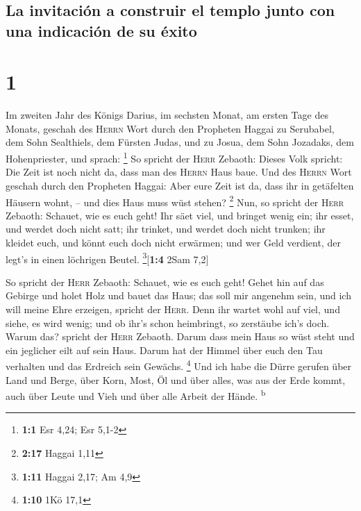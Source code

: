 \hypertarget{la-invitaciuxf3n-a-construir-el-templo-junto-con-una-indicaciuxf3n-de-su-uxe9xito}{%
\subsection{La invitación a construir el templo junto con una indicación
de su
éxito}\label{la-invitaciuxf3n-a-construir-el-templo-junto-con-una-indicaciuxf3n-de-su-uxe9xito}}

\hypertarget{section}{%
\section{1}\label{section}}

 Im zweiten Jahr des Königs Darius, im sechsten Monat, am
ersten Tage des Monats, geschah des \textsc{Herrn} Wort durch den
Propheten Haggai zu Serubabel, dem Sohn Sealthiels, dem Fürsten Judas,
und zu Josua, dem Sohn Jozadaks, dem Hohenpriester, und sprach:
\footnote{\textbf{1:1} Esr 4,24; Esr 5,1-2}  So spricht
der \textsc{Herr} Zebaoth: Dieses Volk spricht: Die Zeit ist noch nicht
da, dass man des \textsc{Herrn} Haus baue.  Und des
\textsc{Herrn} Wort geschah durch den Propheten Haggai: 
Aber eure Zeit ist da, dass ihr in getäfelten Häusern wohnt, -- und dies
Haus muss wüst stehen? \footnote{\textbf{2:17} Haggai 1,11}
 Nun, so spricht der \textsc{Herr} Zebaoth: Schauet, wie
es euch geht!  Ihr säet viel, und bringet wenig ein; ihr
esset, und werdet doch nicht satt; ihr trinket, und werdet doch nicht
trunken; ihr kleidet euch, und könnt euch doch nicht erwärmen; und wer
Geld verdient, der legt's in einen löchrigen Beutel.
\footnote{\textbf{1:11} Haggai 2,17; Am 4,9}{[}\textbf{1:4} 2Sam 7,2{]}

 So spricht der \textsc{Herr} Zebaoth: Schauet, wie es
euch geht!  Gehet hin auf das Gebirge und holet Holz und
bauet das Haus; das soll mir angenehm sein, und ich will meine Ehre
erzeigen, spricht der \textsc{Herr}.  Denn ihr wartet wohl
auf viel, und siehe, es wird wenig; und ob ihr's schon heimbringt, so
zerstäube ich's doch. Warum das? spricht der \textsc{Herr} Zebaoth.
Darum dass mein Haus so wüst steht und ein jeglicher eilt auf sein Haus.
 Darum hat der Himmel über euch den Tau verhalten und das
Erdreich sein Gewächs. \footnote{\textbf{1:10} 1Kö 17,1} 
Und ich habe die Dürre gerufen über Land und Berge, über Korn, Most, Öl
und über alles, was aus der Erde kommt, auch über Leute und Vieh und
über alle Arbeit der Hände. \textsuperscript{b}

